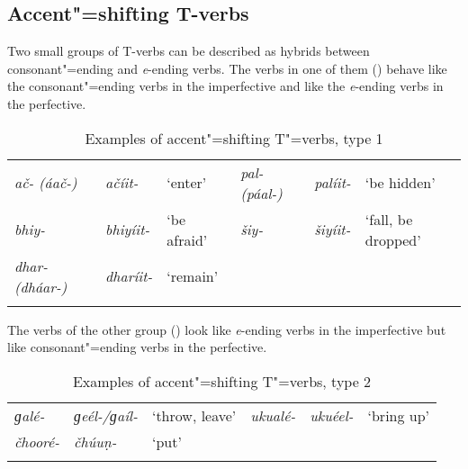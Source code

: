 \addtocounter{footnote}{-2}

\subsection{Accent"=shifting T-verbs}
\label{subsec:8-3-7}


Two small groups of T-verbs can be described as hybrids between consonant"=ending and \textit{e}-ending verbs. The verbs in one of them () behave like the consonant"=ending verbs in the imperfective and like the \textit{e}-ending verbs in the perfective.


\begin{table} 
\caption{Examples of accent"=shifting T"=verbs, type 1}
\begin{tabularx}{\textwidth}{ Q l l l l Q }
\lsptoprule
\textit{ač- (áač-)} &
\textit{ačíit-} &
`enter' &
\textit{pal- (páal-)} &
\textit{palíit-} &
`be hidden'\\
\textit{bhiy-} &
\textit{bhiyíit-} &
`be afraid' &
\textit{šiy-} &
\textit{šiyíit-} &
`fall, be dropped'\\
\textit{dhar- (dháar-)} &
\textit{dharíit-} &
`remain' &
&
&
\\\lspbottomrule
\end{tabularx}
\label{tab:8-tas1}
\end{table}


The verbs of the other group () look like \textit{e}-ending verbs in the imperfective but like consonant"=ending verbs in the perfective. 


\begin{table} 
\caption{Examples of accent"=shifting T"=verbs, type 2}
\begin{tabularx}{\textwidth}{ Q l l Q Q l }
\lsptoprule
\textit{ɡalé-} &
\textit{ɡeél-/ɡaíl-} &
`throw, leave'{\protect\footnotemark} &
\textit{ukualé-} &
\textit{ukuéel-} &
`bring up'{\protect\footnotemark}\\
\textit{čhooré-} &
\textit{čhúuṇ-} &
`put' &
&
&
\\\lspbottomrule
\end{tabularx}
\label{tab:8-tas2}
\end{table}

\addtocounter{footnote}{-2}

